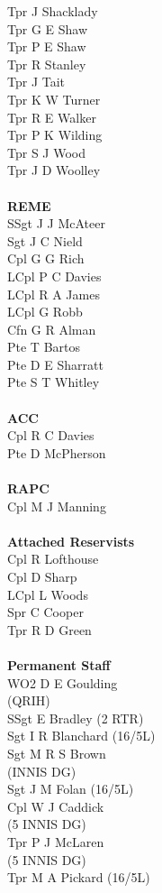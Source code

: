 \begin{multicols}{3}
  Tpr J Shacklady \\
  Tpr G E Shaw \\
  Tpr P E Shaw \\
  Tpr R Stanley \\
  Tpr J Tait \\
  Tpr K W Turner \\
  Tpr R E Walker \\
  Tpr P K Wilding \\
  Tpr S J Wood \\
  Tpr J D Woolley \\
  \\
  \textbf{REME} \\
  SSgt J J McAteer \\
  Sgt J C Nield \\
  Cpl G G Rich \\
  LCpl P C Davies \\
  LCpl R A James \\
  LCpl G Robb \\
  Cfn G R Alman \\
  Pte T Bartos \\
  Pte D E Sharratt \\
  Pte S T Whitley \\
  \\
  \textbf{ACC} \\
  Cpl R C Davies \\
  Pte D McPherson \\
  \\
  \textbf{RAPC} \\
  Cpl M J Manning \\
  \\
  \textbf{Attached Reservists} \\
  Cpl R Lofthouse \\
  Cpl D Sharp \\
  LCpl L Woods \\
  Spr C Cooper \\
  Tpr R D Green \\
  \\
  \textbf{Permanent Staff} \\
  WO2 D E Goulding \\ \indent (QRIH) \\
  SSgt E Bradley (2 RTR) \\
  Sgt I R Blanchard (16/5L) \\
  Sgt M R S Brown \\ \indent (INNIS DG) \\
  Sgt J M Folan (16/5L) \\
  Cpl W J Caddick \\ \indent (5 INNIS DG) \\
  Tpr P J McLaren \\ \indent (5 INNIS DG) \\
  Tpr M A Pickard (16/5L) \\
\end{multicols}
